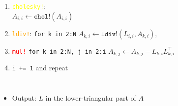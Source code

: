 \documentclass{beamer}
\begin{document}
\begin{frame}
\begin{columns}
\begin{tikzpicture}[thick, scale=1, transform shape]
   \end{tikzpicture}
    
    \begin{enumerate}
      \item<2-> \textcolor{yellow}{\texttt{cholesky!}}: \\
      $A_{i,i} \leftarrow \texttt{chol!}(A_{i,i})$ 
      \item<3-> \textcolor{orange}{\texttt{ldiv!}}: \texttt{for k in 2:N} 
      $A_{k,i} \leftarrow \texttt{ldiv!}(L_{i,i}, A_{k,i}),$
      \item<4-> \textcolor{red}{\texttt{mul!}} \texttt{for k in 2:N, j in 2:i}
      $A_{k,j} \leftarrow A_{k,j} - L_{k,i}L^\top_{k,i}$
      \item<5-> \texttt{i += 1} and repeat
    \end{enumerate}
  \end{columns}
  
  \bigskip
  \begin{itemize}  
    \item<6-> Output: $L$ in the lower-triangular part of $A$
  \end{itemize}

\end{frame}
\end{document}
